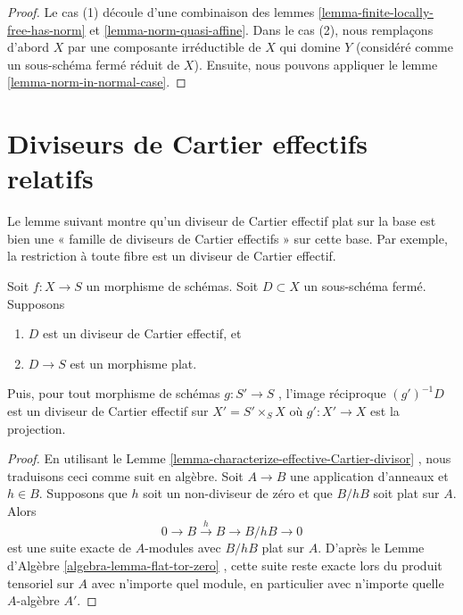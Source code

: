 \begin{proof}
Le cas (1) découle d'une combinaison des lemmes  \ref{lemma-finite-locally-free-has-norm}  et  \ref{lemma-norm-quasi-affine}. Dans
le cas (2), nous remplaçons d'abord  $X$  par une composante irréductible
de  $X$  qui domine  $Y$  (considéré comme un sous-schéma fermé
réduit de  $X$). Ensuite, nous pouvons appliquer le lemme  \ref{lemma-norm-in-normal-case}.
\end{proof}





\section{Diviseurs de Cartier effectifs relatifs}
\label{section-effective-Cartier-morphisms}

\noindent
Le lemme suivant montre qu'un diviseur de Cartier effectif plat sur la
base est bien une « famille de diviseurs de Cartier effectifs » sur cette base.
Par exemple, la restriction à toute fibre est un diviseur de Cartier effectif.

\begin{lemma}
\label{lemma-relative-Cartier}
Soit  $f : X \to S$  un morphisme de schémas. Soit  $D \subset X$  un sous-schéma fermé.
Supposons
\begin{enumerate}
\item $D$  est un diviseur de Cartier effectif, et
\item $D \to S$  est un morphisme plat.
\end{enumerate}
Puis, pour tout morphisme de schémas  $g : S' \to S$ , l'image réciproque  $(g')^{-1}D$ 
est un diviseur de Cartier effectif sur  $X' = S' \times_S X$  où  $g' : X' \to X$  est la
projection.
\end{lemma}

\begin{proof}
En utilisant le Lemme  \ref{lemma-characterize-effective-Cartier-divisor} , nous traduisons ceci comme suit en algèbre.
Soit  $A \to B$  une application d'anneaux et  $h \in B$. Supposons que
 $h$  soit un non-diviseur de zéro et que  $B/hB$  soit plat sur
 $A$. Alors
$$
0 \to B \xrightarrow{h} B \to B/hB \to 0
$$
est une suite exacte de  $A$-modules avec  $B/hB$  plat sur
 $A$. D'après le Lemme d'Algèbre  \ref{algebra-lemma-flat-tor-zero} , cette suite reste exacte
lors du produit tensoriel sur  $A$  avec n'importe quel module, en
particulier avec n'importe quelle  $A$-algèbre  $A'$.
\end{proof}

